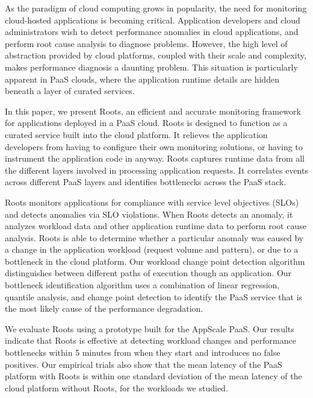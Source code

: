 As the paradigm of cloud computing grows in popularity, the need for monitoring cloud-hosted 
applications is becoming critical. Application developers and cloud administrators
wish to detect performance anomalies in cloud applications, and
perform root cause analysis to diagnose problems. However, the high level of abstraction provided by cloud
platforms, coupled with their scale and complexity, makes performance diagnosis
a daunting problem. This situation is particularly apparent in
PaaS clouds, where the application runtime details are hidden beneath a layer of curated services.

In this paper, we present Roots, an efficient and accurate 
monitoring framework for applications deployed in a PaaS cloud. 
Roots is designed to function as a curated service
built into the cloud platform. 
It relieves the application developers from having to configure
their own monitoring solutions, or having to instrument the application code in anyway.
Roots captures runtime data from all the different layers involved
in processing application requests. It correlates events across different PaaS layers and
identifies bottlenecks across the PaaS stack.

Roots monitors applications for compliance with service level objectives (SLOs) and detects anomalies via SLO violations.
When Roots detects an anomaly, 
it analyzes workload data and other application runtime data
to perform root cause analysis. Roots is able to determine whether a particular
anomaly was caused by a change in the application workload (request volume and pattern), or due to a bottleneck
in the cloud platform. 
Our workload change point detection algorithm
distinguishes between different paths
of execution though an application.  Our bottleneck identification algorithm
uses a combination of linear regression, quantile analysis, 
and change point detection to identify the PaaS service that is 
the most likely cause of the performance degradation. 

We evaluate Roots using a prototype built for the AppScale PaaS. 
Our results indicate that Roots is effective at detecting 
workload changes and performance bottlenecks within 5 
minutes from when they start and introduces no false positives.
Our empirical trials also show that the mean latency of the 
PaaS platform with Roots is within one standard deviation of the mean
latency of the cloud platform without Roots, for the workloads we studied. 

